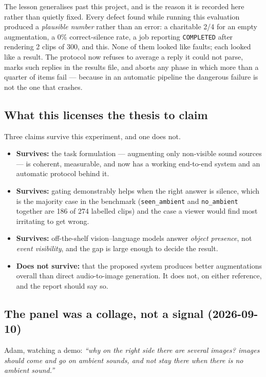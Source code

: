 \documentclass[11pt,a4paper]{article}
\begin{document}
The lesson generalises past this project, and is the reason it is recorded here rather than quietly
fixed. Every defect found while running this evaluation produced a \emph{plausible number} rather
than an error: a charitable 2/4 for an empty augmentation, a 0\% correct-silence rate, a job
reporting \texttt{COMPLETED} after rendering 2 clips of 300, and this. None of them looked like
faults; each looked like a result. The protocol now refuses to average a reply it could not parse,
marks such replies in the results file, and aborts any phase in which more than a quarter of items
fail --- because in an automatic pipeline the dangerous failure is not the one that crashes.

\subsection{What this licenses the thesis to claim}
Three claims survive this experiment, and one does not.

\begin{itemize}
  \item \textbf{Survives:} the task formulation --- augmenting only non-visible sound sources --- is
    coherent, measurable, and now has a working end-to-end system and an automatic protocol behind it.
  \item \textbf{Survives:} gating demonstrably helps when the right answer is silence, which is the
    majority case in the benchmark (\texttt{seen\_ambient} and \texttt{no\_ambient} together are 186
    of 274 labelled clips) and the case a viewer would find most irritating to get wrong.
  \item \textbf{Survives:} off-the-shelf vision--language models answer \emph{object presence}, not
    \emph{event visibility}, and the gap is large enough to decide the result.
  \item \textbf{Does not survive:} that the proposed system produces better augmentations overall
    than direct audio-to-image generation. It does not, on either reference, and the report should
    say so.
\end{itemize}

\subsection{The panel was a collage, not a signal (2026-09-10)}\label{sec:transient}
Adam, watching a demo: \emph{``why on the right side there are several images? images should come
and go on ambient sounds, and not stay there when there is no ambient sound.''}
\end{document}
